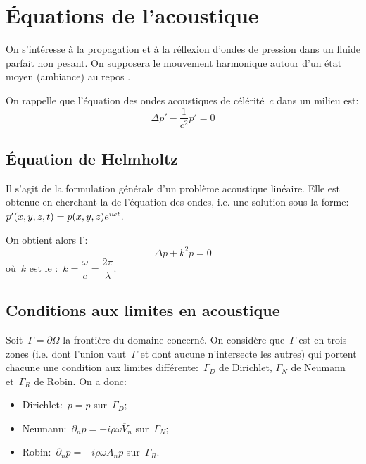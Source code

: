 \medskip
\section{Équations de l'acoustique}
On s'intéresse à la propagation et à la réflexion d'ondes de pression dans un fluide parfait non pesant. On supposera le mouvement harmonique autour d'un état moyen (ambiance) au repos .

\medskip
On rappelle que l'équation des ondes acoustiques de célérité~$c$ dans un milieu est:
\begin{equation}
\Delta p' - \dfrac1{c^2} \ddot{p}' = 0
\end{equation}

\medskip
\subsection{Équation de Helmholtz}
Il s'agit de la formulation générale d'un problème acoustique linéaire. Elle est obtenue en cherchant la  de l'équation des ondes, i.e. une solution sous la forme:~$p'(x,y,z,t)=p(x,y,z)\mathrm \mathrm{e}^{i\omega t}$. 

On obtient alors l':
\begin{equation} \Delta p + k^2 p=0 \end{equation}
où~$k$ est le :~$k=\dfrac\omega{c}=\dfrac{2\pi}\lambda$.

\medskip
\subsection{Conditions aux limites en acoustique}
Soit~$\Gamma=\partial\Omega$ la frontière du domaine concerné. On considère que~$\Gamma$ est  en trois zones (i.e. dont l'union vaut~$\Gamma$ et dont aucune n'intersecte les autres) qui portent chacune une condition aux limites différente:~$\Gamma_D$ de Dirichlet, $\Gamma_N$ de Neumann et~$\Gamma_R$ de Robin.
\medskipvm
On a donc:
\begin{itemize}
  \item Dirichlet:~$p=\overline{p}$ sur~$\Gamma_D$;\\[-2ex]
  \item Neumann:~$\partial_n p = -i\rho\omega \overline{V}_n$ sur~$\Gamma_N$;\\[-2ex]
  \item Robin:~$\partial_n p=-i\rho\omega A_n p$ sur~$\Gamma_R$.
\end{itemize}
\medskipvm{}
